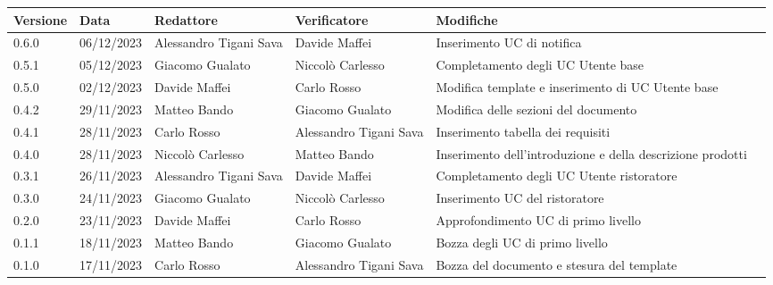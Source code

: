 \begin{table}[H]
	\centering
	\fontsize{10}{12}\selectfont
	\begin{tabularx}{\textwidth}{X|X|X|X|X|X}
		\textbf{Versione}     & \textbf{Data}        & \textbf{Redattore}     &
		\textbf{Verificatore}  & \textbf{Modifiche}	\\
		\toprule
		0.6.0                 & 06/12/2023           & Alessandro Tigani Sava & Davide Maffei                     & Inserimento UC di notifica                                 \\
		\hline
		0.5.1                 & 05/12/2023           & Giacomo Gualato        & Niccolò Carlesso                    & Completamento degli UC Utente base                         \\
		\hline
		0.5.0                 & 02/12/2023           & Davide Maffei          & Carlo Rosso                & Modifica template e inserimento di UC Utente base          \\
		\hline
		0.4.2                 & 29/11/2023           & Matteo Bando           & Giacomo Gualato                  & Modifica delle sezioni del documento                \\
		\hline
		0.4.1                 & 28/11/2023           & Carlo Rosso            & Alessandro Tigani Sava           & Inserimento tabella dei requisiti                          \\
		\hline
		0.4.0                 & 28/11/2023           & Niccolò Carlesso       & Matteo Bando           & Inserimento dell'introduzione e della descrizione prodotti \\
		\hline
		0.3.1                 & 26/11/2023           & Alessandro Tigani Sava & Davide Maffei                     & Completamento degli UC Utente ristoratore                  \\
		\hline
		0.3.0                 & 24/11/2023           & Giacomo Gualato        & Niccolò Carlesso                   & Inserimento UC del ristoratore             \\
		\hline
		0.2.0                 & 23/11/2023           & Davide Maffei          & Carlo Rosso         		 & Approfondimento UC di primo livello        \\
		\hline
		0.1.1                 & 18/11/2023           & Matteo Bando           & Giacomo Gualato                & Bozza degli UC di primo livello            \\
		\hline
		0.1.0                 & 17/11/2023           & Carlo Rosso            & Alessandro Tigani Sava         & Bozza del documento e stesura del template \\
		\bottomrule
	\end{tabularx}
\end{table}